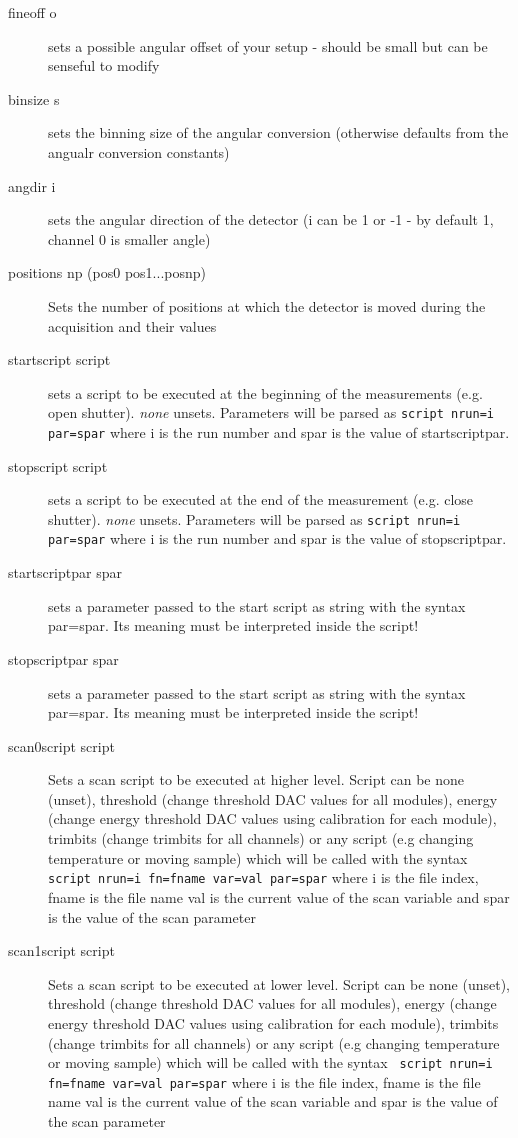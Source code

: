 \documentclass{report}
\begin{document}
\begin{description}
\item[fineoff o] 	sets a possible angular offset of your setup - should be small but can be senseful to modify
\item[binsize s] 	sets the binning size of the angular conversion (otherwise defaults from the angualr conversion constants)
\item[angdir i] 	sets the angular direction of the detector (i can be 1 or -1 - by default 1, channel 0 is smaller angle)
\item[positions np (pos0 pos1...posnp)] 	Sets the number of positions at which the detector is moved during the acquisition and their values
\item[startscript script] sets a script to be executed at the beginning of the measurements (e.g. open shutter). \textit{none} unsets. Parameters will be parsed as \verb|script nrun=i par=spar| where i is the run number and spar is the value of startscriptpar.
\item[stopscript script] sets a script to be executed at the end of the measurement (e.g. close shutter). \textit{none} unsets. Parameters will be parsed as \verb|script nrun=i par=spar| where i is the run number and spar is the value of stopscriptpar.
\item[startscriptpar spar] sets a parameter passed to the start script as string with the syntax par=spar. Its meaning must be interpreted inside the script!
\item[stopscriptpar spar] sets a parameter passed to the start script as string with the syntax par=spar. Its meaning must be interpreted inside the script!
\item[scan0script script] Sets a scan script to be executed at higher level. Script can be none (unset), threshold (change threshold DAC values for all modules), energy (change energy threshold DAC values using calibration for each module), trimbits (change trimbits for all channels) or any script (e.g changing temperature or moving sample) which will be called with the syntax \verb| script nrun=i fn=fname var=val par=spar| where i is the file index, fname is the file name val is the current value of the scan variable and spar is the value of the scan parameter
\item[scan1script script]  Sets a scan script to be executed at lower level. Script can be none (unset), threshold (change threshold DAC values for all modules), energy (change energy threshold DAC values using calibration for each module), trimbits (change trimbits for all channels) or any script (e.g changing temperature or moving sample) which will be called with the syntax \verb| script nrun=i fn=fname var=val par=spar| where i is the file index, fname is the file name val is the current value of the scan variable and spar is the value of the scan parameter

\end{description}
\end{document}
